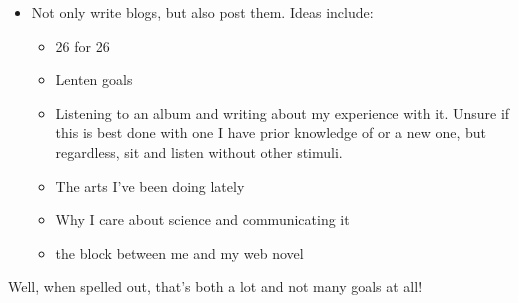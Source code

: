 \documentclass[12pt]{article}[titlepage]
\renewcommand{\,}{\textsuperscript{,}}
\begin{document}
\begin{itemize}
\begin{itemize}
\begin{itemize}
\item Not only write blogs, but also post them. Ideas include:  
\begin{itemize}  
\item 26 for 26  
\item Lenten goals  
\item Listening to an album and writing about my experience with it. Unsure if this is best done with one I have prior knowledge of or a new one, but regardless, sit and listen without other stimuli.  
\item The arts I've been doing lately  
\item Why I care about science and communicating it  
\item the block between me and my web novel  
\end{itemize}  
\end{itemize}  
\end{itemize}  
\end{itemize}  
Well, when spelled out, that's both a lot and not many goals at all!
\end{document}
